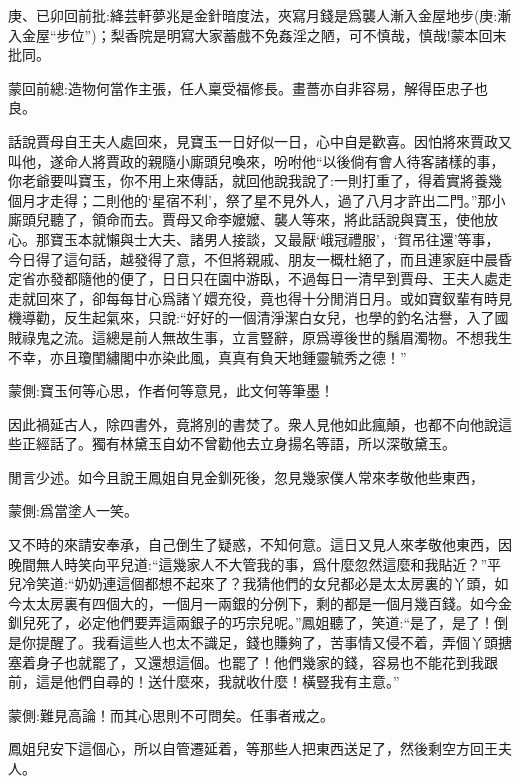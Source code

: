 
\begin{parag}
    \begin{note}庚、已卯回前批:絳芸軒夢兆是金針暗度法，夾寫月錢是爲襲人漸入金屋地步(庚:漸入金屋“步位”)；梨香院是明寫大家蓄戲不免姦淫之陋，可不慎哉，慎哉!蒙本回末批同。\end{note}
\end{parag}


\begin{parag}
    \begin{note}蒙回前總:造物何當作主張，任人稟受福修長。畫薔亦自非容易，解得臣忠子也良。\end{note}
\end{parag}


\begin{parag}
    話說賈母自王夫人處回來，見寶玉一日好似一日，心中自是歡喜。因怕將來賈政又叫他，遂命人將賈政的親隨小廝頭兒喚來，吩咐他“以後倘有會人待客諸樣的事，你老爺要叫寶玉，你不用上來傳話，就回他說我說了:一則打重了，得着實將養幾個月才走得；二則他的‘星宿不利’，祭了星不見外人，過了八月才許出二門。”那小廝頭兒聽了，領命而去。賈母又命李嬤嬤、襲人等來，將此話說與寶玉，使他放心。那寶玉本就懶與士大夫、諸男人接談，又最厭‘峨冠禮服’，‘賀吊往還’等事，今日得了這句話，越發得了意，不但將親戚、朋友一概杜絕了，而且連家庭中晨昏定省亦發都隨他的便了，日日只在園中游臥，不過每日一清早到賈母、王夫人處走走就回來了，卻每每甘心爲諸丫嬛充役，竟也得十分閒消日月。或如寶釵輩有時見機導勸，反生起氣來，只說:“好好的一個清淨潔白女兒，也學的釣名沽譽，入了國賊祿鬼之流。這總是前人無故生事，立言豎辭，原爲導後世的鬚眉濁物。不想我生不幸，亦且瓊閨繡閣中亦染此風，真真有負天地鍾靈毓秀之德！”\begin{note}蒙側:寶玉何等心思，作者何等意見，此文何等筆墨！\end{note}因此禍延古人，除四書外，竟將別的書焚了。衆人見他如此瘋顛，也都不向他說這些正經話了。獨有林黛玉自幼不曾勸他去立身揚名等語，所以深敬黛玉。
\end{parag}


\begin{parag}
    閒言少述。如今且說王鳳姐自見金釧死後，忽見幾家僕人常來孝敬他些東西，\begin{note}蒙側:爲當塗人一笑。\end{note}又不時的來請安奉承，自己倒生了疑惑，不知何意。這日又見人來孝敬他東西，因晚間無人時笑向平兒道:“這幾家人不大管我的事，爲什麼忽然這麼和我貼近？”平兒冷笑道:“奶奶連這個都想不起來了？我猜他們的女兒都必是太太房裏的丫頭，如今太太房裏有四個大的，一個月一兩銀的分例下，剩的都是一個月幾百錢。如今金釧兒死了，必定他們要弄這兩銀子的巧宗兒呢。”鳳姐聽了，笑道:“是了，是了！倒是你提醒了。我看這些人也太不識足，錢也賺夠了，苦事情又侵不着，弄個丫頭搪塞着身子也就罷了，又還想這個。也罷了！他們幾家的錢，容易也不能花到我跟前，這是他們自尋的！送什麼來，我就收什麼！橫豎我有主意。”\begin{note}蒙側:難見高論！而其心思則不可問矣。任事者戒之。\end{note}鳳姐兒安下這個心，所以自管遷延着，等那些人把東西送足了，然後剩空方回王夫人。
\end{parag}


